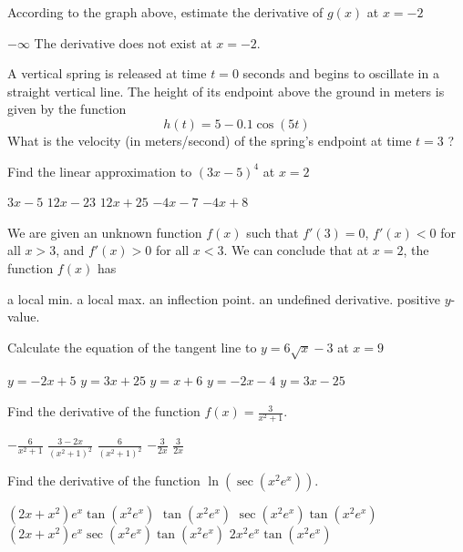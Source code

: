 \documentclass[11pt]{article}
\begin{document}
\begin{questions}
\begin{multiplechoice}{5}
\question According to the graph above, estimate the derivative of $g(x)$ at $x = -2$
\begin{answers}{2}
\ans $-\infty$
\ans The derivative does not exist at $x= -2$.
\end{answers}


\question A vertical spring is released at time $t = 0$ seconds and begins to oscillate in a straight vertical line.
The height of its endpoint above the ground in meters is given by the function
$$h(t) = 5 - 0.1\cos(5t)$$
What is the velocity (in meters/second) of the spring's endpoint at time $t = 3$ ?
\begin{answers}{2}
\end{answers}

\newpage

\question Find the linear approximation to $(3x-5)^4$ at $x = 2$
\begin{answers}{2}
\ans $3x - 5$
\ans $12x - 23$
\ans $12x + 25$
\ans $-4x - 7$
\ans $-4x + 8$
\end{answers}


\question We are given an unknown function $f(x)$ such that $f'(3) = 0$, $f'(x) < 0$ for all $x > 3$, and $f'(x) > 0$ for all $x < 3$.
We can conclude that at $x = 2$, the function $f(x)$ has 
\begin{answers}{3}
\ans a local min.
\ans a local max.
\ans an inflection point.
\ans an undefined derivative.
\ans positive $y$-value.
\end{answers}

\question Calculate the equation of the tangent line to $y = 6 \sqrt{x} - 3$ at $x = 9$
\begin{answers}{2}
\ans $y = -2x + 5$
\ans $y = 3x + 25$
\ans $y = x + 6$
\ans $y = -2x -4$
\ans $y = 3x - 25$
\end{answers}


\question Find the derivative of the function $\displaystyle f(x) = \frac{3}{x^2 +1}$.
\begin{answers}{2}
\ans $ \displaystyle - \frac{6}{x^2 + 1}$
\ans $ \displaystyle  \frac{3 - 2x }{(x^2 + 1)^2}$
\ans $ \displaystyle  \frac{6}{(x^2 + 1)^2}$
\ans $ \displaystyle  - \frac{3}{2x}$
\ans $ \displaystyle  \frac{3}{2x}$
\end{answers}

\question Find the derivative of the function $\ln(\sec(x^2 e^x))$.
\begin{answers}{2}
\ans $(2x + x^2)e^x \tan(x^2 e^x)$
\ans $\tan(x^2 e^x)$
\ans $ \sec(x^2 e^x)\tan(x^2 e^x)$
\ans $(2x + x^2)e^x \sec(x^2 e^x)\tan(x^2 e^x)$
\ans $2x^2e^x \tan(x^2 e^x)$
\end{answers}


\end{multiplechoice}
\end{questions}
\end{document}

